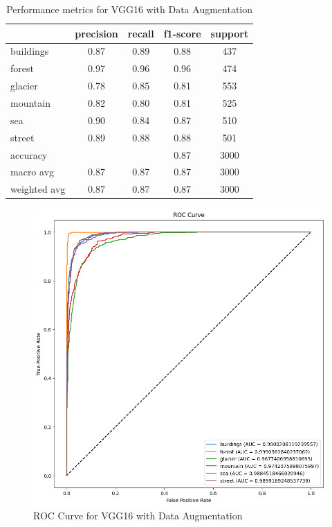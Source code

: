 \documentclass[conference]{IEEEtran}
\begin{document}
\begin{table}[H]
\centering
\begin{tabular}{lcccc}
\toprule
\textbf{} & \textbf{precision} & \textbf{recall} & \textbf{f1-score} & \textbf{support} \\
\midrule
buildings & 0.87 & 0.89 & 0.88 & 437 \\
forest & 0.97 & 0.96 & 0.96 & 474 \\
glacier & 0.78 & 0.85 & 0.81 & 553 \\
mountain & 0.82 & 0.80 & 0.81 & 525 \\
sea & 0.90 & 0.84 & 0.87 & 510 \\
street & 0.89 & 0.88 & 0.88 & 501 \\
\midrule
accuracy & & & 0.87 & 3000 \\
macro avg & 0.87 & 0.87 & 0.87 & 3000 \\
weighted avg & 0.87 & 0.87 & 0.87 & 3000 \\
\bottomrule
\end{tabular}
\caption{Performance metrics for VGG16 with Data Augmentation}
\end{table}


\begin{figure}[H]
    \centering
    \includegraphics[width=1\linewidth]{images//VGG16/ROC_VGG16_DA.png}
    \caption{ROC Curve for VGG16 with Data Augmentation}
    \label{fig:ROC_VGG_DA}
\end{figure}
\end{document}
